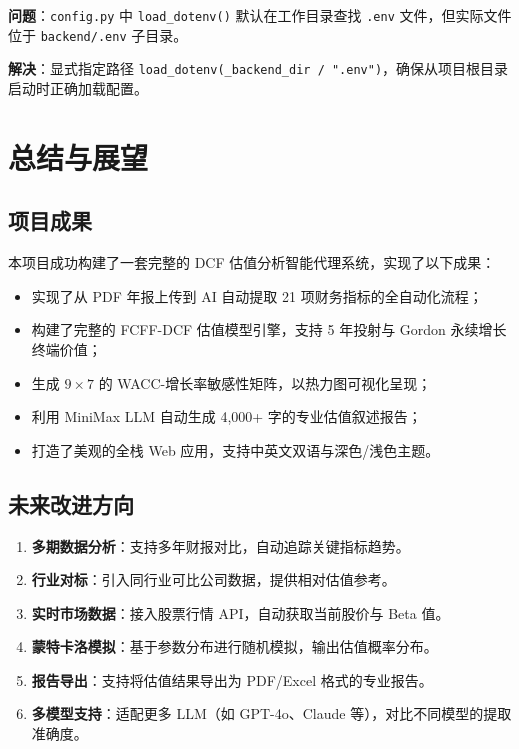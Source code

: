 \documentclass[12pt,a4paper]{article}
\begin{document}
\textbf{问题}：\texttt{config.py} 中 \texttt{load\_dotenv()} 默认在工作目录查找 \texttt{.env} 文件，但实际文件位于 \texttt{backend/.env} 子目录。

\textbf{解决}：显式指定路径 \texttt{load\_dotenv(\_backend\_dir / ".env")}，确保从项目根目录启动时正确加载配置。

\section{总结与展望}

\subsection{项目成果}

本项目成功构建了一套完整的 DCF 估值分析智能代理系统，实现了以下成果：

\begin{itemize}[leftmargin=2em]
  \item 实现了从 PDF 年报上传到 AI 自动提取 21 项财务指标的全自动化流程；
  \item 构建了完整的 FCFF-DCF 估值模型引擎，支持 5 年投射与 Gordon 永续增长终端价值；
  \item 生成 $9 \times 7$ 的 WACC-增长率敏感性矩阵，以热力图可视化呈现；
  \item 利用 MiniMax LLM 自动生成 4,000+ 字的专业估值叙述报告；
  \item 打造了美观的全栈 Web 应用，支持中英文双语与深色/浅色主题。
\end{itemize}

\subsection{未来改进方向}

\begin{enumerate}[leftmargin=2em]
  \item \textbf{多期数据分析}：支持多年财报对比，自动追踪关键指标趋势。
  \item \textbf{行业对标}：引入同行业可比公司数据，提供相对估值参考。
  \item \textbf{实时市场数据}：接入股票行情 API，自动获取当前股价与 Beta 值。
  \item \textbf{蒙特卡洛模拟}：基于参数分布进行随机模拟，输出估值概率分布。
  \item \textbf{报告导出}：支持将估值结果导出为 PDF/Excel 格式的专业报告。
  \item \textbf{多模型支持}：适配更多 LLM（如 GPT-4o、Claude 等），对比不同模型的提取准确度。
\end{enumerate}
\end{document}
